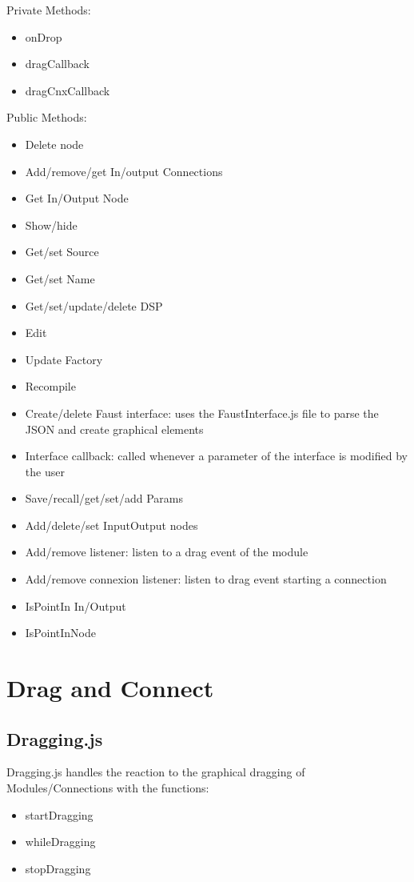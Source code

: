 \documentclass[a4paper]{article}
\begin{document}
Private Methods:
\begin{itemize}
\item onDrop 
\item dragCallback
\item dragCnxCallback
\end{itemize}

Public Methods:
\begin{itemize}
\item Delete node
\item Add/remove/get In/output Connections
\item Get In/Output Node
\item Show/hide
\item Get/set Source
\item Get/set Name
\item Get/set/update/delete DSP
\item Edit
\item Update Factory
\item Recompile
\item Create/delete Faust interface: uses the FaustInterface.js file to parse the JSON and create graphical elements
\item Interface callback: called whenever a parameter of the interface is modified by the user
\item Save/recall/get/set/add Params
\item Add/delete/set InputOutput nodes
\item Add/remove listener: listen to a drag event of the module
\item Add/remove connexion listener: listen to drag event starting a connection
\item IsPointIn In/Output
\item IsPointInNode
\end{itemize}



\section{Drag and Connect}
\subsection{Dragging.js}

Dragging.js handles the reaction to the graphical dragging of Modules/Connections with the functions:
\begin{itemize}
\item startDragging
\item whileDragging
\item stopDragging
\end{itemize}
\end{document}
